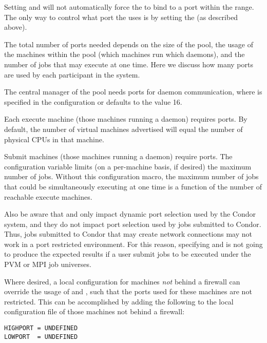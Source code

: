 \Note Setting  and  will not
automatically force the  to bind to a port within
the range.
The only way to control what port the  uses is by
setting the  (as described above).

The total number of ports needed depends on the size of the pool,
the usage of the machines within the pool (which machines
run which daemons),
and the number of jobs that may execute at one time.
Here we discuss how many ports are used by each
participant in the system.

The central manager of the pool needs
ports for daemon communication,
where 
is specified in the
configuration or defaults to the value 16.

Each execute machine (those machines running a  daemon)
requires
ports.
By default, the number of virtual machines advertised
will equal the number of physical CPUs in that machine.

Submit machines (those machines running a  daemon)
require
 ports.
The configuration variable 
limits (on a per-machine basis, if desired)
the maximum number of jobs.
Without this configuration macro,
the maximum number of jobs that could be simultaneously
executing at one time
is a function of the number of reachable execute machines. 

Also be aware that  and 
only impact dynamic port selection used by the Condor system,
and they do not impact port selection used by jobs submitted to Condor.
Thus, jobs submitted to Condor that may create
network connections may not work in a port restricted environment.
For this reason, specifying  and 
is not going to produce the
expected results if a user submit jobs to be executed under
the PVM or MPI job universes.

Where desired, a local
configuration for machines \emph{not} behind a firewall
can override the usage of  and ,
such that the ports used for these machines are not restricted.
This can be accomplished by adding the following to the
local configuration file of those machines not
behind a firewall:
\begin{verbatim}
HIGHPORT = UNDEFINED
LOWPORT  = UNDEFINED
\end{verbatim}



